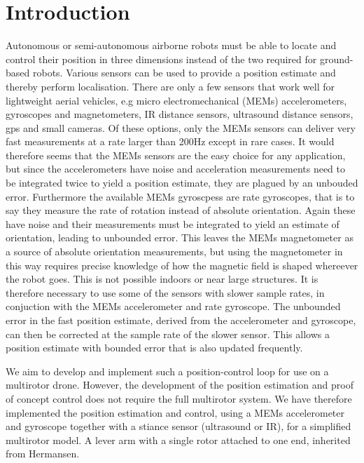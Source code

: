 \section{Introduction}
Autonomous or semi-autonomous airborne robots must be able to locate and control their position in three dimensions instead of
the two required for ground-based robots. Various sensors can be used to provide a position estimate and thereby perform localisation.
There are only a few sensors that work well for lightweight aerial vehicles, e.g micro electromechanical (MEMs) accelerometers, 
gyroscopes and magnetometers, IR distance sensors, ultrasound distance sensors, gps and small cameras. Of these options, only the MEMs
sensors can deliver very fast measurements at a rate larger than 200Hz except in rare cases. It would therefore seems that the MEMs
sensors are the easy choice for any application, but since the accelerometers have noise and acceleration measurements need to be 
integrated twice to yield a position estimate, they are plagued by an unbouded error. Furthermore the available MEMs gyroscpess are rate 
gyroscopes, that is to say they measure the rate of rotation instead of absolute orientation. Again these have noise and their measurements
must be integrated to yield an estimate of orientation, leading to unbounded error. This leaves the MEMs magnetometer as a source of
absolute orientation measurements, but using the magnetometer in this way requires precise knowledge of how the magnetic field is 
shaped whereever the robot goes. This is not possible indoors or near large structures.
It is therefore necessary to use some of the sensors with slower sample rates, in conjuction with
the MEMs accelerometer and rate gyroscope. The unbounded error in the fast position estimate, derived from the accelerometer and gyroscope,
can then be corrected at the sample rate of the slower sensor. This allows a position estimate with bounded error that is also updated
frequently. 

We aim to develop and implement such a position-control loop for use on a multirotor drone. However, the development of the position 
estimation and proof of concept control does not require the full multirotor system. We have therefore implemented the position estimation 
and control, using a MEMs accelerometer and gyroscope together with a stiance sensor (ultrasound or IR), for a simplified multirotor model. 
A lever arm with a single rotor attached to one end, inherited from Hermansen\cite{hermansen2013a}.
